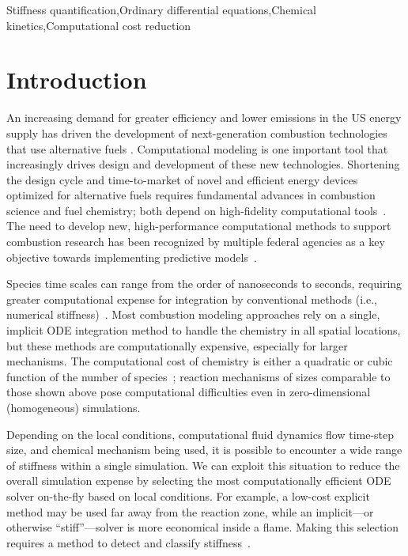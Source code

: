 \documentclass[12pt]{ussci}
\begin{document}
\begin{keyword}
    Stiffness quantification\sep Ordinary differential equations\sep Chemical kinetics\sep Computational cost reduction
\end{keyword}

\section{Introduction}
%

An increasing demand for greater efficiency and lower  emissions in the US energy supply has driven the development of next-generation combustion technologies that use alternative fuels \cite{Epstein2012}.
Computational modeling is one important tool that increasingly drives design and development of these new technologies.
Shortening the design cycle and time-to-market of novel and efficient energy devices optimized for alternative fuels requires fundamental advances in combustion science and fuel chemistry; both depend on high-fidelity computational tools~\cite{Niemeyer}.
The need to develop new, high-performance computational methods to support combustion research has been recognized by multiple federal agencies as a key objective towards implementing predictive models~\cite{Trouve:2006tq,DOE:2007tj,NationalResearchCouncil:2011ub,National-Research-Council:2014aa}.

Species time scales can range from the order of nanoseconds to seconds, requiring greater computational expense for integration by conventional methods (i.e., numerical stiffness)~\cite{Lu2009}.
Most combustion modeling approaches rely on a single, implicit ODE integration method to handle the chemistry in all spatial locations, but these methods are computationally expensive, especially for larger mechanisms.
The computational cost of chemistry is either a quadratic or cubic function of the number of species~\cite{Lu2009}; reaction mechanisms of sizes comparable to those shown above pose computational difficulties even in zero-dimensional (homogeneous) simulations.

Depending on the local conditions, computational fluid dynamics flow time-step size, and chemical mechanism being used, it is possible to encounter a wide range of stiffness within a single simulation.
We can exploit this situation to reduce the overall simulation expense by selecting the most computationally efficient ODE solver on-the-fly based on local conditions.
For example, a low-cost explicit method may be used far away from the reaction zone, while an implicit---or otherwise ``stiff''---solver is more economical inside a flame.
Making this selection requires a method to detect and classify stiffness~\cite{Niemeyer}.
\end{document}
